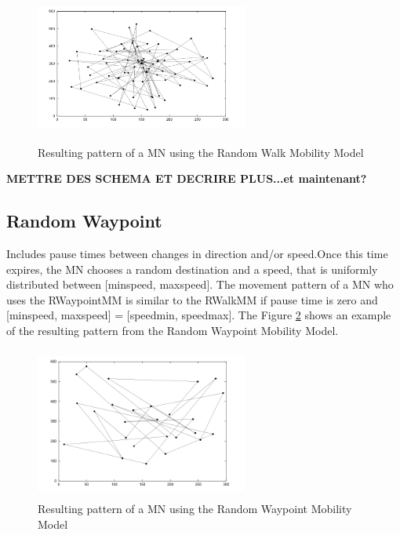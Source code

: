 \begin{figure}[h]
\center
\includegraphics[width=7cm,height=50mm]{../images/randomwalk1.png}
\caption{\label{RandomWalkFig}Resulting pattern of a MN using the Random Walk Mobility Model}
\end{figure}


\textbf{METTRE DES SCHEMA ET DECRIRE PLUS...et maintenant?}

\subsection{Random Waypoint}

Includes pause times between changes in direction and/or speed.Once this time expires, the MN chooses a random destination and a speed, that is uniformly distributed between [minspeed, maxspeed]. The movement pattern of a MN who uses the RWaypointMM is similar to the RWalkMM if pause time is zero and [minspeed, maxspeed] = [speedmin, speedmax]. The Figure \ref{RandomWaypointFig} shows an example of the resulting pattern from the Random Waypoint Mobility Model.

\begin{figure}[h]
\center
\includegraphics[width=7cm,height=50mm]{../images/randomwaypoint1.png}
\caption{\label{RandomWaypointFig}Resulting pattern of a MN using the Random Waypoint Mobility Model}
\end{figure}

